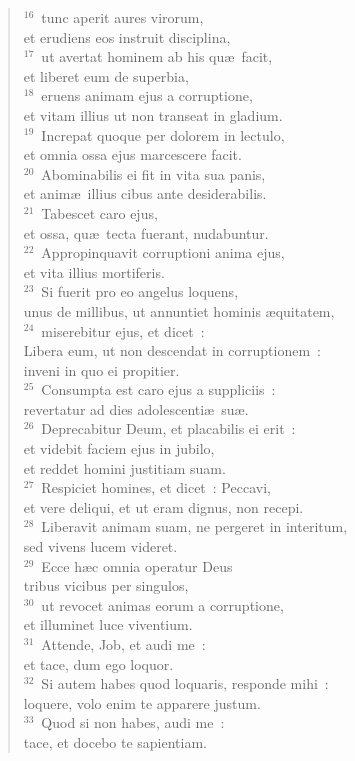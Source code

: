 \begin{flushleft}
\begin{verse}
${}^{16}$~tunc aperit aures virorum,\\ et erudiens eos instruit disciplina,\\
${}^{17}$~ut avertat hominem ab his qu\ae\ facit,\\ et liberet eum de superbia,\\
${}^{18}$~eruens animam ejus a corruptione,\\ et vitam illius ut non transeat in gladium.\\
${}^{19}$~Increpat quoque per dolorem in lectulo,\\ et omnia ossa ejus marcescere facit.\\
${}^{20}$~Abominabilis ei fit in vita sua panis,\\ et anim\ae\ illius cibus ante desiderabilis.\\
${}^{21}$~Tabescet caro ejus,\\ et ossa, qu\ae\ tecta fuerant, nudabuntur.\\
${}^{22}$~Appropinquavit corruptioni anima ejus,\\ et vita illius mortiferis.\\
${}^{23}$~Si fuerit pro eo angelus loquens,\\ unus de millibus, ut annuntiet hominis \ae quitatem,\\
${}^{24}$~miserebitur ejus, et dicet~:\\ Libera eum, ut non descendat in corruptionem~:\\ inveni in quo ei propitier.\\
${}^{25}$~Consumpta est caro ejus a suppliciis~:\\ revertatur ad dies adolescenti\ae\ su\ae .\\
${}^{26}$~Deprecabitur Deum, et placabilis ei erit~:\\ et videbit faciem ejus in jubilo,\\ et reddet homini justitiam suam.\\
${}^{27}$~Respiciet homines, et dicet~: Peccavi,\\ et vere deliqui, et ut eram dignus, non recepi.\\
${}^{28}$~Liberavit animam suam, ne pergeret in interitum,\\ sed vivens lucem videret.\\
${}^{29}$~Ecce h\ae c omnia operatur Deus\\ tribus vicibus per singulos,\\
${}^{30}$~ut revocet animas eorum a corruptione,\\ et illuminet luce viventium.\\
${}^{31}$~Attende, Job, et audi me~:\\ et tace, dum ego loquor.\\
${}^{32}$~Si autem habes quod loquaris, responde mihi~:\\ loquere, volo enim te apparere justum.\\
${}^{33}$~Quod si non habes, audi me~:\\ tace, et docebo te sapientiam.\end{verse}\end{flushleft}


